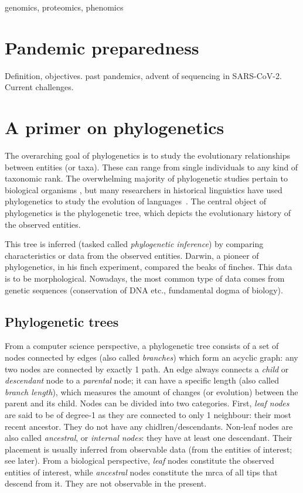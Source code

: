 genomics, proteomics, phenomics

\section{Pandemic preparedness}

Definition, objectives. past pandemics, advent of sequencing in SARS-CoV-2. Current challenges.

\section{A primer on phylogenetics}
The overarching goal of phylogenetics is to study the evolutionary relationships between entities (or taxa). These can range from single individuals to any kind of taxonomic rank. The overwhelming majority of phylogenetic studies pertain to biological organisms \cite{felsenstein2004, yang2014, stadler2024}, but many researchers in historical linguistics have used phylogenetics to study the evolution of languages~\cite{greenhill2023}. The central object of phylogenetics is the phylogenetic tree, which depicts the evolutionary history of the observed entities. 

This tree is inferred (tasked called \textit{phylogenetic inference}) by comparing characteristics or data from the observed entities. Darwin, a pioneer of phylogenetics, in his finch experiment, compared the beaks of finches. This data is to be morphological. Nowadays, the most common type of data comes from genetic sequences (conservation of DNA etc., fundamental dogma of biology).

\subsection{Phylogenetic trees}

From a computer science perspective, a phylogenetic tree consists of a set of nodes connected by edges (also called \textit{branches}) which form an acyclic graph: any two nodes are connected by exactly 1 path. An edge always connects a \textit{child} or \textit{descendant} node to a \textit{parental} node; it can have a specific length (also called \textit{branch length}), which measures the amount of changes (or evolution) between the parent and its child. Nodes can be divided into two categories. First, \textit{leaf nodes} are said to be of degree-1 as they are connected to only 1 neighbour: their most recent ancestor. They do not have any chidlren/descendants. Non-leaf nodes are also called \textit{ancestral}, or \textit{internal nodes}: they have at least one descendant. Their placement is usually inferred from observable data (from the entities of interest; see later). From a biological perspective, \textit{leaf} nodes constitute the observed entities of interest, while \textit{ancestral} nodes constitute the \gls{mrca} of all tips that descend from it. They are not observable in the present.


